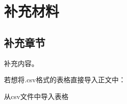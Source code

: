 
\chapter{补充材料}


\section{补充章节}

补充内容。

若想将.csv格式的表格直接导入正文中：

\begin{table}
	\centering
	\caption{从csv文件中导入表格}
	\begin{adjustbox}{max width=\linewidth}
	\end{adjustbox}
	\label{tab:asterid}
\end{table}
